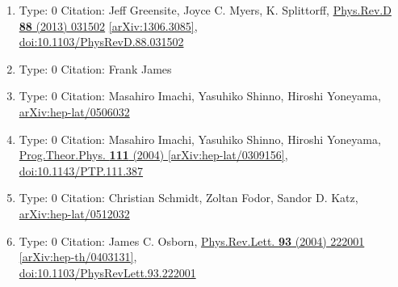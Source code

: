 \documentclass[a4paper,10pt]{article}
\begin{document}
\begin{enumerate}
\begin{enumerate}
  \item Type: 0 Citation: Jeff Greensite, Joyce C. Myers, K. Splittorff, \href{https://www.doi.org/10.1103/PhysRevD.88.031502}{Phys.Rev.D {\bf 88} (2013) 031502}  \href{https://arxiv.org/abs/1306.3085}{[arXiv:1306.3085]},\\\href{https://www.doi.org/10.1103/PhysRevD.88.031502}{doi:10.1103/PhysRevD.88.031502}
  \item Type: 0 Citation: Frank James
  \item Type: 0 Citation: Masahiro Imachi, Yasuhiko Shinno, Hiroshi Yoneyama, \href{https://arxiv.org/abs/hep-lat/0506032}{arXiv:hep-lat/0506032}
  \item Type: 0 Citation: Masahiro Imachi, Yasuhiko Shinno, Hiroshi Yoneyama, \href{https://www.doi.org/10.1143/PTP.111.387}{Prog.Theor.Phys. {\bf 111} (2004) }  \href{https://arxiv.org/abs/hep-lat/0309156}{[arXiv:hep-lat/0309156]},\\\href{https://www.doi.org/10.1143/PTP.111.387}{doi:10.1143/PTP.111.387}
  \item Type: 0 Citation: Christian Schmidt, Zoltan Fodor, Sandor D. Katz, \href{https://arxiv.org/abs/hep-lat/0512032}{arXiv:hep-lat/0512032}
  \item Type: 0 Citation: James C. Osborn, \href{https://www.doi.org/10.1103/PhysRevLett.93.222001}{Phys.Rev.Lett. {\bf 93} (2004) 222001}  \href{https://arxiv.org/abs/hep-th/0403131}{[arXiv:hep-th/0403131]},\\\href{https://www.doi.org/10.1103/PhysRevLett.93.222001}{doi:10.1103/PhysRevLett.93.222001}

\end{enumerate}
\end{enumerate}
\end{document}
